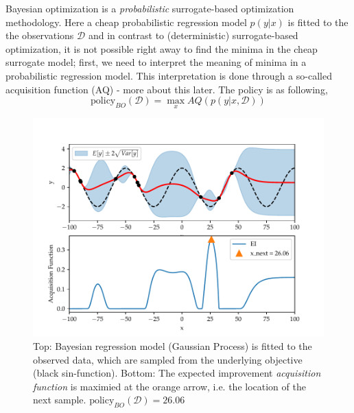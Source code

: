 \begin{testexample}
    Bayesian optimization is a \textit{probabilistic} surrogate-based optimization
    methodology. Here a cheap probabilistic regression model $p(y|x)$ is fitted to the
    the observations $\mathcal{D}$ and in contrast to (deterministic) surrogate-based
    optimization, it is not possible right away to find the minima in the cheap
    surrogate model; first, we need to interpret the meaning of minima in a probabilistic
    regression model. This interpretation is done through a so-called acquisition
    function (AQ) - more about this later. The policy is as following,
    $$\text{policy}_{BO}(\mathcal{D}) = \max_x AQ(p(y|x,\mathcal{D}))$$

    \begin{figure}[H]
        \begin{minipage}[c]{0.67\textwidth}
          \includegraphics[width=\textwidth]{Pictures/BO_example.pdf}
        \end{minipage}\hfill
        \begin{minipage}[c]{0.3\textwidth}
          \caption{Top: Bayesian regression model (Gaussian Process) is fitted to the observed data,
          which are sampled from the underlying objective (black sin-function). Bottom: The expected improvement
          \textit{acquisition function} is maximied at the orange arrow, i.e. the location of the
          next sample.  $\text{policy}_{BO}(\mathcal{D}) = 26.06$} \label{BO_example}
        \end{minipage}
    \end{figure}
\end{testexample}



